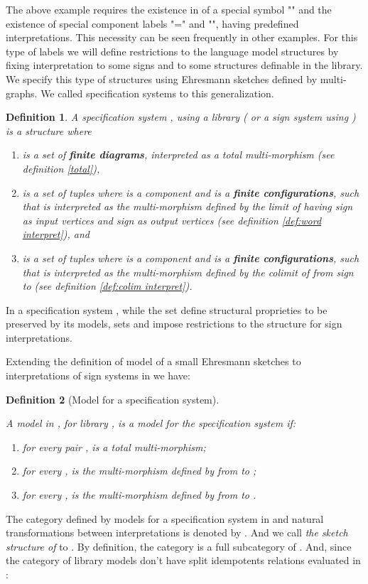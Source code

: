 \documentclass[oribibl]{llncs}
\newtheorem{defn}{Definition}
\begin{document}
The above example requires the existence in  of a special symbol "" and the existence of special component labels "="
and "", having predefined interpretations. This necessity can be seen frequently in other examples. For this type of labels we will define restrictions to the language  model structures by fixing interpretation to some signs and to some structures definable in the library.  We specify this type of structures using Ehresmann sketches defined by multi-graphs. We called  specification systems to this generalization.

\begin{defn}
A \emph{specification system} , using a library  ( or a
\emph{sign system}  using ) is a structure 
where
\begin{enumerate}
  \item  is a set of \textbf{finite diagrams}, interpreted as a total multi-morphism (see definition \ref{total}),
  \item  is a set of tuples  where  is a component and  is a \textbf{finite configurations}, such that  is interpreted as the multi-morphism defined by the limit of  having sign  as input vertices and sign  as output vertices (see definition \ref{def:word interpret}), and
  \item  is a set of tuples  where  is a component and  is a \textbf{finite configurations}, such that  is interpreted as the multi-morphism defined by the colimit of  from sign  to  (see definition \ref{def:colim interpret}).
\end{enumerate}
\end{defn}

In a specification system  , while the set  define structural proprieties to be preserved by its models, sets  and  impose restrictions to the structure for sign interpretations.

Extending the definition of model of a small Ehresmann sketches to interpretations of sign systems in  we have:
\begin{defn}[Model for a specification system]\label{Modelspec}

 A model  in , for library , is a model for the specification system
 if:
\begin{enumerate}
  \item for every pair ,   is a total multi-morphism;
  \item for every ,  is the multi-morphism defined by  from  to ;
  \item for every ,  is the multi-morphism defined by  from  to  .
\end{enumerate}

\end{defn}
The category defined by models for a specification system in
 and natural transformations between interpretations is denoted by . And we call \emph{the sketch structure of}  to . By definition, the category  is a full subcategory of . And, since the category of library models don't have split idempotents relations evaluated in :
\end{document}
